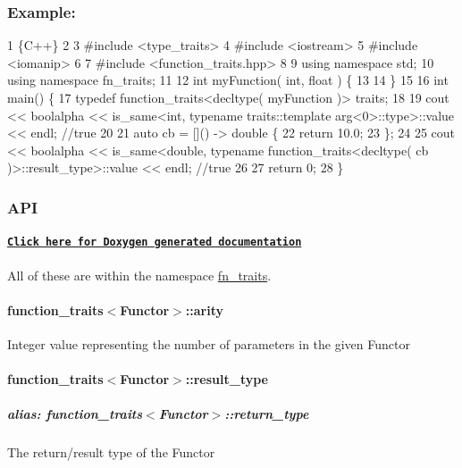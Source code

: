 \subsubsection*{Example\+:}


\begin{DoxyCode}
1 \{C++\}
2 
3 #include <type\_traits>
4 #include <iostream>
5 #include <iomanip>
6 
7 #include <function\_traits.hpp>
8 
9 using namespace std;
10 using namespace fn\_traits;
11 
12 int myFunction( int, float ) \{
13 
14 \}
15 
16 int main() \{
17     typedef function\_traits<decltype( myFunction )> traits;
18 
19     cout << boolalpha << is\_same<int, typename traits::template arg<0>::type>::value << endl; //true
20 
21     auto cb = []() -> double \{
22         return 10.0;
23     \};
24 
25     cout << boolalpha << is\_same<double, typename function\_traits<decltype( cb )>::result\_type>::value <<
       endl; //true
26 
27     return 0;
28 \}
\end{DoxyCode}


\subsubsection*{A\+PI}

\paragraph*{\href{https://novacrazy.github.io/function_traits/html/index.html}{\tt Click here for Doxygen generated documentation}}

All of these are within the namespace {\ttfamily \hyperlink{namespacefn__traits}{fn\+\_\+traits}}.

\paragraph*{{\ttfamily function\+\_\+traits$<$Functor$>$\+::arity}}

Integer value representing the number of parameters in the given Functor

\paragraph*{{\ttfamily function\+\_\+traits$<$Functor$>$\+::result\+\_\+type}}

\subparagraph*{alias\+: {\ttfamily function\+\_\+traits$<$Functor$>$\+::return\+\_\+type}}

The return/result type of the Functor

